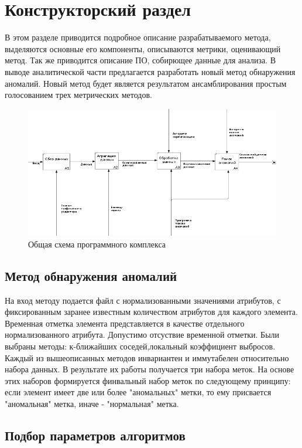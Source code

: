 \chapter{Конструкторский раздел}
В этом разделе приводится подробное описание разрабатываемого метода, выделяются основные его компоненты, описываются метрики, оценивающий метод. Так же приводится описание ПО, собирющее данные для анализа.
В выводе аналитической части предлагается разработать новый метод обнаружения аномалий. Новый метод будет является результатом ансамблирования простым голосованием трех метрических методов.

\begin{figure}[!h]
	\centering
	\includegraphics[width=.9\textwidth]{img2/idef0.png}
	\caption{Общая схема программного комплекса}
	\label{fig08}
\end{figure}
\section{Метод обнаружения аномалий}
На вход методу подается файл с нормализованными значениями атрибутов, с фиксированным заранее известным количеством атрибутов для каждого элемента. Временная отметка элемента представляется в качестве отдельного нормализованного атрибута. Допустимо отсуствие временной отметки.
Были выбраны методы: к-ближайших соседей,локальный коэффициент выбросов.
Каждый из вышеописанных методов инвариантен и иммутабелен относительно набора данных. В результате их работы получается три набора меток. На основе этих наборов формируется финвальный набор меток по следующему принципу: если элемент имеет две или более "аномальных" метки, то ему присвается "аномальная" метка, иначе - "нормальная" метка.
\section{Подбор параметров алгоритмов}
